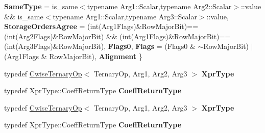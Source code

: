 \begin{DoxyCompactItemize}
{\bfseries Same\+Type} = is\+\_\+same$<$typename Arg1\+:\+:Scalar,typename Arg2\+:\+:Scalar$>$\+:\+:value \&\& is\+\_\+same$<$typename Arg1\+:\+:Scalar,typename Arg3\+:\+:Scalar$>$\+:\+:value, 
{\bfseries Storage\+Orders\+Agree} = (int(Arg1\+Flags)\&Row\+Major\+Bit)==(int(Arg2\+Flags)\&Row\+Major\+Bit) \&\& (int(Arg1\+Flags)\&Row\+Major\+Bit)==(int(Arg3\+Flags)\&Row\+Major\+Bit), 
{\bfseries Flags0}, 
{\bfseries Flags} = (Flags0 \& $\sim$\+Row\+Major\+Bit) $\vert$ (Arg1\+Flags \& Row\+Major\+Bit), 
\newline
{\bfseries Alignment}
 \}
\item 
\mbox{\label{struct_eigen_1_1internal_1_1ternary__evaluator_3_01_cwise_ternary_op_3_01_ternary_op_00_01_arg1_daf42d21bcfee99cfa54e03ffa9506fc_a0caf670eb51af4cb632e03e3b7a910f9}} 
typedef \hyperlink{group___core___module_class_eigen_1_1_cwise_ternary_op}{Cwise\+Ternary\+Op}$<$ Ternary\+Op, Arg1, Arg2, Arg3 $>$ {\bfseries Xpr\+Type}
\item 
\mbox{\label{struct_eigen_1_1internal_1_1ternary__evaluator_3_01_cwise_ternary_op_3_01_ternary_op_00_01_arg1_daf42d21bcfee99cfa54e03ffa9506fc_a73724cae680d9ce3cdbe1dd4427274e6}} 
typedef Xpr\+Type\+::\+Coeff\+Return\+Type {\bfseries Coeff\+Return\+Type}
\item 
\mbox{\label{struct_eigen_1_1internal_1_1ternary__evaluator_3_01_cwise_ternary_op_3_01_ternary_op_00_01_arg1_daf42d21bcfee99cfa54e03ffa9506fc_a0caf670eb51af4cb632e03e3b7a910f9}} 
typedef \hyperlink{group___core___module_class_eigen_1_1_cwise_ternary_op}{Cwise\+Ternary\+Op}$<$ Ternary\+Op, Arg1, Arg2, Arg3 $>$ {\bfseries Xpr\+Type}
\item 
\mbox{\label{struct_eigen_1_1internal_1_1ternary__evaluator_3_01_cwise_ternary_op_3_01_ternary_op_00_01_arg1_daf42d21bcfee99cfa54e03ffa9506fc_a73724cae680d9ce3cdbe1dd4427274e6}} 
typedef Xpr\+Type\+::\+Coeff\+Return\+Type {\bfseries Coeff\+Return\+Type}
\end{DoxyCompactItemize}
